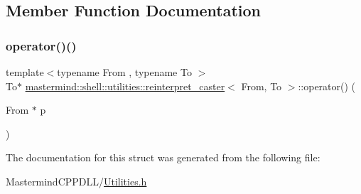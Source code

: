 \subsection{Member Function Documentation}
\hypertarget{structmastermind_1_1shell_1_1utilities_1_1reinterpret__caster_ad71fd2afb60510914c98f9bc5e004cc0}{}\label{structmastermind_1_1shell_1_1utilities_1_1reinterpret__caster_ad71fd2afb60510914c98f9bc5e004cc0} 
\subsubsection{\texorpdfstring{operator()()}{operator()()}}
{\footnotesize\ttfamily template$<$typename From , typename To $>$ \\
To$\ast$ \hyperlink{structmastermind_1_1shell_1_1utilities_1_1reinterpret__caster}{mastermind\+::shell\+::utilities\+::reinterpret\+\_\+caster}$<$ From, To $>$\+::operator() (\begin{DoxyParamCaption}\item[{From $\ast$}]{p }\end{DoxyParamCaption})\hspace{0.3cm}{\ttfamily [inline]}}



The documentation for this struct was generated from the following file\+:\begin{DoxyCompactItemize}
\item 
Mastermind\+C\+P\+P\+D\+L\+L/\hyperlink{_utilities_8h}{Utilities.\+h}\end{DoxyCompactItemize}
